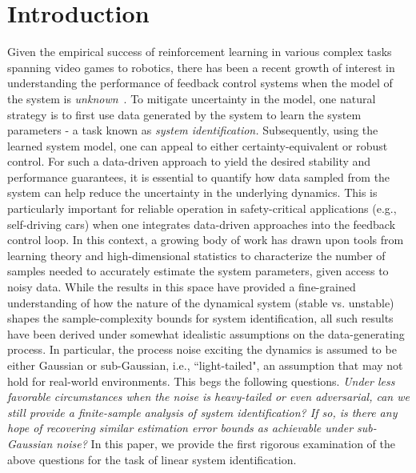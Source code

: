 \documentclass[letterpaper, 11 pt]{article}
\begin{document}
\section{Introduction}
\label{sec:Intro}
Given the empirical success of reinforcement learning in various complex tasks spanning video games to robotics, there has been a recent growth of interest in understanding the performance of feedback control systems when the model of the system is \emph{unknown}~\cite{hu2023toward, tsiamis2023statistical}. To mitigate uncertainty in the model, one natural strategy is to first use data generated by the system to learn the system parameters - a task known as \emph{system identification.} Subsequently, using the learned system model, one can appeal to either certainty-equivalent or robust control. For such a data-driven approach to yield the desired stability and performance guarantees, it is essential to quantify how data sampled from the system can help reduce the uncertainty in the underlying dynamics. This is particularly important for reliable operation in safety-critical applications (e.g., self-driving cars) when one integrates data-driven approaches into the feedback control loop. In this context, a growing body of work has drawn upon tools from learning theory and high-dimensional statistics to characterize the number of samples needed to accurately estimate the system parameters, given access to noisy data. While the results in this space have provided a fine-grained understanding of how the nature of the dynamical system (stable vs. unstable) shapes the sample-complexity bounds for system identification, all such results have been derived under somewhat idealistic assumptions on the data-generating process. In particular, the process noise exciting the dynamics is assumed to be either Gaussian or sub-Gaussian, i.e., ``light-tailed", an assumption that may not hold for real-world environments. This begs the following questions. \emph{Under less favorable circumstances when the noise is heavy-tailed or even adversarial, can we still provide a finite-sample analysis of system identification? If so, is there any hope of recovering similar estimation error bounds as achievable under sub-Gaussian noise?} 
In this paper, we provide the first rigorous examination of the above questions for the task of linear system identification.  
\end{document}

